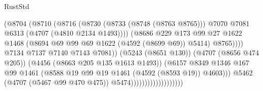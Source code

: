 \begin{lexlean}{RustStd}
\begin{coremodule}
                                                  (@8704
                                                    (@8710
                                                      (@8716
                                                        (@8730
                                                          (@8733 (@8748 (@8763 @8765)))
                                                          @7070
                                                          @7081
                                                          @6313
                                                          (@4707 (@4810 @2134 @1493))))
                                                      (@8686
                                                        @229
                                                        @173
                                                        @99
                                                        @27
                                                        @1622
                                                        @1468
                                                        (@8694
                                                          @69
                                                          @99
                                                          @69
                                                          @1622
                                                          (@4592 (@8699 @69))
                                                          @5414)
                                                        @8765))))
                                                @7134
                                                @7137
                                                @7140
                                                @7143
                                                @7081))
                                            (@5243 (@8651 @130))
                                            (@4707 (@8656 @474 @205))
                                            (@4456 (@8663 @205 @135 @1613 @1493))
                                            (@6157
                                              @8349
                                              @1346
                                              @167
                                              @99
                                              @1461
                                              (@8588 @19 @99 @19 @1461 (@4592 (@8593 @19)) @4603)))
                                          @5462
                                          (@4707 (@5467 @99 @470 @475))
                                          @5474)))))))))))))))))))

\end{coremodule}
\end{lexlean}
